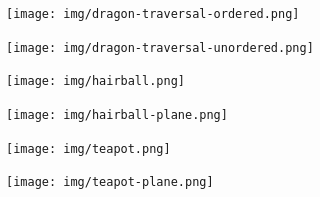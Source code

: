 \begin{center}
\begin{minipage}{0.48\linewidth}
\texttt{[image: img/dragon-traversal-ordered.png]}
\end{minipage}
\begin{minipage}{0.48\linewidth}
\texttt{[image: img/dragon-traversal-unordered.png]}
\end{minipage}
\end{center}

\begin{center}
\begin{minipage}{0.48\linewidth}
\texttt{[image: img/hairball.png]}
\end{minipage}
\begin{minipage}{0.48\linewidth}
\texttt{[image: img/hairball-plane.png]}
\end{minipage}
\end{center}

\begin{center}
\begin{minipage}{0.48\linewidth}
\texttt{[image: img/teapot.png]}
\end{minipage}
\begin{minipage}{0.48\linewidth}
\texttt{[image: img/teapot-plane.png]}
\end{minipage}
\end{center}
